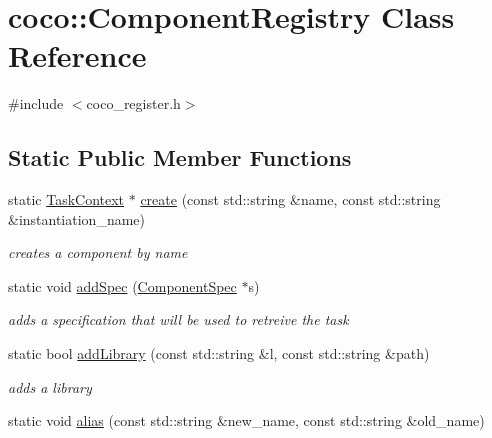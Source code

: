 \hypertarget{classcoco_1_1_component_registry}{}\section{coco\+:\+:Component\+Registry Class Reference}
\label{classcoco_1_1_component_registry}


{\ttfamily \#include $<$coco\+\_\+register.\+h$>$}

\subsection*{Static Public Member Functions}
\begin{DoxyCompactItemize}
\item 
\hypertarget{classcoco_1_1_component_registry_ae36312bd1970b4609c9b9830033fa218}{}static \hyperlink{classcoco_1_1_task_context}{Task\+Context} $\ast$ \hyperlink{classcoco_1_1_component_registry_ae36312bd1970b4609c9b9830033fa218}{create} (const std\+::string \&name, const std\+::string \&instantiation\+\_\+name)\label{classcoco_1_1_component_registry_ae36312bd1970b4609c9b9830033fa218}

\begin{DoxyCompactList}\small\item\em creates a component by name \end{DoxyCompactList}\item 
\hypertarget{classcoco_1_1_component_registry_ac242dec3121dc83d32638c092541889f}{}static void \hyperlink{classcoco_1_1_component_registry_ac242dec3121dc83d32638c092541889f}{add\+Spec} (\hyperlink{classcoco_1_1_component_spec}{Component\+Spec} $\ast$s)\label{classcoco_1_1_component_registry_ac242dec3121dc83d32638c092541889f}

\begin{DoxyCompactList}\small\item\em adds a specification that will be used to retreive the task \end{DoxyCompactList}\item 
\hypertarget{classcoco_1_1_component_registry_ac7b83f380957618ffad187bc345388b6}{}static bool \hyperlink{classcoco_1_1_component_registry_ac7b83f380957618ffad187bc345388b6}{add\+Library} (const std\+::string \&l, const std\+::string \&path)\label{classcoco_1_1_component_registry_ac7b83f380957618ffad187bc345388b6}

\begin{DoxyCompactList}\small\item\em adds a library \end{DoxyCompactList}\item 
\hypertarget{classcoco_1_1_component_registry_ab575270de86c745f8ac5ad2aa5d79851}{}static void \hyperlink{classcoco_1_1_component_registry_ab575270de86c745f8ac5ad2aa5d79851}{alias} (const std\+::string \&new\+\_\+name, const std\+::string \&old\+\_\+name)\label{classcoco_1_1_component_registry_ab575270de86c745f8ac5ad2aa5d79851}


\end{DoxyCompactItemize}
